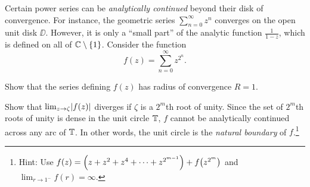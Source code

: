 \documentclass{../math135}
\begin{document}
\begin{exercise}
	Certain power series can be \emph{analytically continued} beyond
  their disk of convergence.  For instance, the geometric series
  \(\sum_{n=0}^\infty z^n\) converges on the open unit disk \(\DD\).
  However, it is only a ``small part'' of the analytic function
  \(\frac{1}{1-z}\), which is defined on all of
  \(\mathbb C \setminus \{1\}\).  Consider the function
  \[
		f(z) = \sum_{n=0}^\infty z^{2^n}.
  \]

	\begin{problems}
  \item Show that the series defining \(f(z)\) has radius of
    convergence \(R = 1\).

    \begin{solution}

    \end{solution}

  \item Show that \(\lim_{z\to\zeta} \abs*{f(z)}\) diverges if
    \(\zeta\) is a \(2^m\)th root of unity.  Since the set of
    \(2^m\)th roots of unity is dense in the unit circle \(\mathbb T\),
    \(f\) cannot be analytically continued across any arc of \(\mathbb T\).
    In other words, the unit circle is the \emph{natural boundary} of
    \(f\).\footnote{Hint: Use
      \(f(z) = \prn*{z + z^2 + z^4 + \cdots + z^{2^{m-1}}} +f
      \prn*{z^{2^m}}\) and \(\lim_{r \to 1^-} f(r) = \infty\).}

    \begin{solution}

    \end{solution}

	\end{problems}
\end{exercise}
\end{document}
